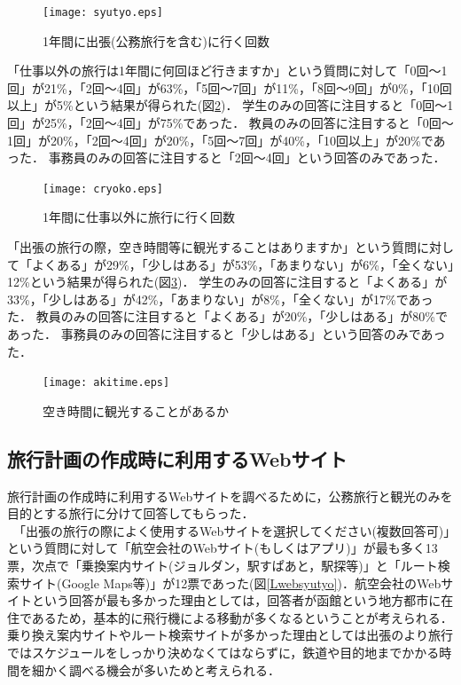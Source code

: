 \documentclass{funthesis}
\begin{document}
\begin{figure}[htpb]
\begin{center}
\texttt{[image: syutyo.eps]}
\end{center}
\caption{1年間に出張(公務旅行を含む)に行く回数}
\label{Lsyutyo}
\end{figure}


「仕事以外の旅行は1年間に何回ほど行きますか」という質問に対して「0回〜1回」が21\%，「2回〜4回」が63\%，「5回〜7回」が11\%，「8回〜9回」が0\%，「10回以上」が5\%という結果が得られた(図\ref{Lcryoko})．
学生のみの回答に注目すると「0回〜1回」が25\%，「2回〜4回」が75\%であった．
教員のみの回答に注目すると「0回〜1回」が20\%，「2回〜4回」が20\%，「5回〜7回」が40\%，「10回以上」が20\%であった．
事務員のみの回答に注目すると「2回〜4回」という回答のみであった．


\begin{figure}[htpb]
\begin{center}
\texttt{[image: cryoko.eps]}
\end{center}
\caption{1年間に仕事以外に旅行に行く回数}
\label{Lcryoko}
\end{figure}


「出張の旅行の際，空き時間等に観光することはありますか」という質問に対して「よくある」が29\%，「少しはある」が53\%，「あまりない」が6\%，「全くない」12\%という結果が得られた(図\ref{Lakitime})．
学生のみの回答に注目すると「よくある」が33\%，「少しはある」が42\%，「あまりない」が8\%，「全くない」が17\%であった．
教員のみの回答に注目すると「よくある」が20\%，「少しはある」が80\%であった．
事務員のみの回答に注目すると「少しはある」という回答のみであった．

\begin{figure}[htpb]
\begin{center}
\texttt{[image: akitime.eps]}
\end{center}
\caption{空き時間に観光することがあるか}
\label{Lakitime}
\end{figure}



\subsection{旅行計画の作成時に利用するWebサイト}

旅行計画の作成時に利用するWebサイトを調べるために，公務旅行と観光のみを目的とする旅行に分けて回答してもらった．\\
　「出張の旅行の際によく使用するWebサイトを選択してください(複数回答可)」という質問に対して「航空会社のWebサイト(もしくはアプリ)」が最も多く13票，次点で「乗換案内サイト(ジョルダン，駅すぱあと，駅探等)」と「ルート検索サイト(Google Maps等)」が12票であった(図\ref{Lwebsyutyo})．航空会社のWebサイトという回答が最も多かった理由としては，回答者が函館という地方都市に在住であるため，基本的に飛行機による移動が多くなるということが考えられる．乗り換え案内サイトやルート検索サイトが多かった理由としては出張のより旅行ではスケジュールをしっかり決めなくてはならずに，鉄道や目的地までかかる時間を細かく調べる機会が多いためと考えられる．
\end{document}
